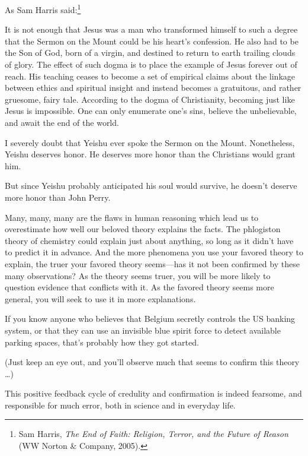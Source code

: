 {
 As Sam Harris said:\footnote{Sam Harris, \textit{The End of Faith: Religion, Terror, and the
Future of Reason} (WW Norton \& Company, 2005).}}

{
 It is not enough that Jesus was a man who transformed himself to
such a degree that the Sermon on the Mount could be his
heart's confession. He also had to be the Son of God,
born of a virgin, and destined to return to earth trailing clouds of
glory. The effect of such dogma is to place the example of Jesus
forever out of reach. His teaching ceases to become a set of empirical
claims about the linkage between ethics and spiritual insight and
instead becomes a gratuitous, and rather gruesome, fairy tale.
According to the dogma of Christianity, becoming just like Jesus is
impossible. One can only enumerate one's sins, believe
the unbelievable, and await the end of the world.}

{
 I severely doubt that Yeishu ever spoke the Sermon on the Mount.
Nonetheless, Yeishu deserves honor. He deserves more honor than the
Christians would grant him.}

{
 But since Yeishu probably anticipated his soul would survive, he
doesn't deserve more honor than John Perry.}

\myendsectiontext


\bigskip


{
 Many, many, many are the flaws in human reasoning which lead us to
overestimate how well our beloved theory explains the facts. The
phlogiston theory of chemistry could explain just about anything, so
long as it didn't have to predict it in advance. And
the more phenomena you use your favored theory to explain, the truer
your favored theory seems---has it not been confirmed by these many
observations? As the theory seems truer, you will be more likely to
question evidence that conflicts with it. As the favored theory seems
more general, you will seek to use it in more explanations. }

{
 If you know anyone who believes that Belgium secretly controls the
US banking system, or that they can use an invisible blue spirit force
to detect available parking spaces, that's probably how
they got started.}

{
 (Just keep an eye out, and you'll observe much
that seems to confirm this theory \ldots)}

{
 This positive feedback cycle of credulity and confirmation is
indeed fearsome, and responsible for much error, both in science and in
everyday life.}

